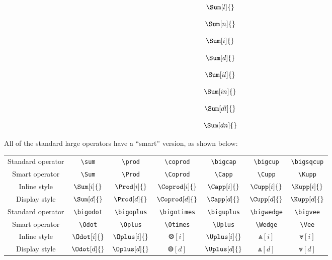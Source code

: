 \documentclass[10pt]{extarticle}
\newcommand{\<}{\langle}
\renewcommand{\>}{\rangle}
\theoremstyle{mystyle}{\newtheorem*{remark}{Remark}}
\theoremstyle{mystyle}{\newtheorem*{remarks}{Remarks}}
\theoremstyle{mystyle}{\newtheorem*{example}{Example}}
\theoremstyle{mystyle}{\newtheorem*{examples}{Examples}}
\theoremstyle{definition}{\newtheorem*{exercise}{Exercise}}
\theoremstyle{warn}
\begin{document}
\begin{multicols}{2}
\begin{verbbox}
$$\Sum[l]{}$$
\end{verbbox}

\begin{verbbox}
$$\Sum[n]{}$$
\end{verbbox}

\begin{verbbox}
$$\Sum[i]{}$$
\end{verbbox}

\begin{verbbox}
$$\Sum[d]{}$$
\end{verbbox}
\begin{verbbox}
$$\Sum[il]{}$$
\end{verbbox}

\begin{verbbox}
$$\Sum[in]{}$$
\end{verbbox}

\begin{verbbox}
$$\Sum[dl]{}$$
\end{verbbox}

\begin{verbbox}
$$\Sum[dn]{}$$
\end{verbbox}
\end{multicols}

All of the standard large operators have a ``smart'' version, as shown below:

\begin{center}
\renewcommand*{\arraystretch}{1.5} %
\begin{tabular}{ccccccc}
    Standard operator & \verb!\sum! & \verb!\prod! & \verb!\coprod! & \verb!\bigcap! & \verb!\bigcup! & \verb!\bigsqcup! \\
    Smart operator & \verb!\Sum! & \verb!\Prod! & \verb!\Coprod! & \verb!\Capp! & \verb!\Cupp! & \verb!\Kupp! \\
    Inline style & $\Sum[i]{}$ & $\Prod[i]{}$ & $\Coprod[i]{}$ & $\Capp[i]{}$ & $\Cupp[i]{}$ & $\Kupp[i]{}$ \\
    Display style & $\Sum[d]{}$ & $\Prod[d]{}$ & $\Coprod[d]{}$ & $\Capp[d]{}$ & $\Cupp[d]{}$ & $\Kupp[d]{}$ \\[12pt] %
    Standard operator & \verb!\bigodot! & \verb!\bigoplus! & \verb!\bigotimes! & \verb!\biguplus! & \verb!\bigwedge! & \verb!\bigvee! \\
    Smart operator & \verb!\Odot! & \verb!\Oplus! & \verb!\Otimes! & \verb!\Uplus! & \verb!\Wedge! & \verb!\Vee! \\
    Inline style & $\Odot[i]{}$ & $\Oplus[i]{}$ & $\Otimes[i]{}$ & $\Uplus[i]{}$ & $\Wedge[i]{}$ & $\Vee[i]{}$ \\
    Display style & $\Odot[d]{}$ & $\Oplus[d]{}$ & $\Otimes[d]{}$ & $\Uplus[d]{}$ & $\Wedge[d]{}$ & $\Vee[d]{}$
\end{tabular}
\end{center}
\end{document}
